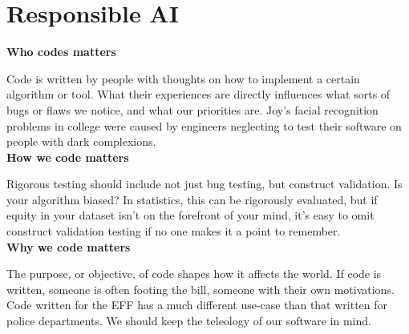 \documentclass[11pt,largemargins, anonymous]{homework}
\begin{document}
\clearpage
\maketitle
\clearpage

\part{Responsible AI}

\question

\textbf{Who codes matters}

Code is written by people with thoughts on how to implement a certain algorithm or tool.
What their experiences are directly influences what sorts of bugs or flaws we notice,
and what our priorities are.
Joy's facial recognition problems in college were caused by engineers
neglecting to test their software on people with dark complexions.
\\

\textbf{How we code matters}

Rigorous testing should include not just bug testing, but construct validation.
Is your algorithm biased? In statistics, this can be rigorously evaluated,
but if equity in your dataset isn't on the forefront of your mind,
it's easy to omit construct validation testing if no one makes it a point to remember.
\\

\textbf{Why we code matters}

The purpose, or objective, of code shapes how it affects the world.
If code is written, someone is often footing the bill, someone with their own motivations.
Code written for the EFF has a much different use-case than that written for police departments.
We should keep the teleology of our software in mind.

\question
\end{document}
